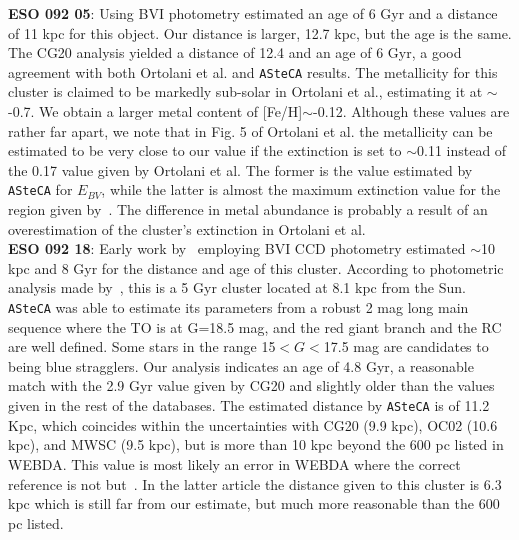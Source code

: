 \documentclass[draft]{aa}
\begin{document}
\begin{appendix}
  \noindent \textbf{ESO 092 05}: Using BVI photometry \cite{Ortolani_2008} estimated
  an age of 6 Gyr and a distance of 11 kpc for this object. Our distance is
  larger, 12.7 kpc, but the age is the same.
  The CG20 analysis yielded a distance of 12.4 and an age of 6 Gyr, a good
  agreement with both Ortolani et al. and \texttt{ASteCA} results.
  The metallicity for this cluster is claimed to be markedly sub-solar in
  Ortolani et al., estimating it at $\sim$-0.7. We obtain a
  larger metal content of [Fe/H]$\sim$-0.12. Although these values are rather far
  apart, we note that in Fig. 5 of Ortolani et al. the metallicity can be
  estimated to be very close to our value if the extinction is set to
  $\sim$0.11 instead of the 0.17 value given by Ortolani et al. The former is
  the value estimated by \texttt{ASteCA} for $E_{BV}$, while the latter
  is almost the maximum extinction value for the region given
  by~\cite{Schlafly_2011}. The difference in metal abundance is probably a
  result of an overestimation of the cluster's extinction in Ortolani et al.\\

  \noindent \textbf{ESO 092 18}: Early work by~\cite{Kubiak_1991} employing BVI CCD
  photometry estimated $\sim$10 kpc and 8 Gyr for the distance and age of this
  cluster.
  According to photometric analysis made by~\cite{Carraro1995}, this is a 5 Gyr
  cluster located at 8.1 kpc from the Sun.
  \texttt{ASteCA} was able to estimate its parameters from a robust 2 mag long
  main sequence where the TO is at G=18.5 mag, and the red giant branch and the
  RC are well defined. Some stars in the range 15$<G<$17.5 mag are candidates to
  being blue stragglers.
  Our analysis indicates an age of 4.8 Gyr, a reasonable match with the 2.9 Gyr
  value given by CG20 and slightly older than the values given in the rest of
  the databases. The estimated distance by \texttt{ASteCA} is of 11.2 Kpc, which
  coincides within the uncertainties with CG20 (9.9 kpc), OC02 (10.6 kpc), and
  MWSC (9.5 kpc), but is more than 10 kpc beyond the 600 pc listed in WEBDA.
  This value is most likely an error in WEBDA where the correct reference is
  not \cite{Phelps_1994_develop} but~\cite{Janes_1994}. In the latter article
  the distance given to this cluster is 6.3 kpc which is still far from our
  estimate, but much more reasonable than the 600 pc listed.\\


\end{appendix}
\end{document}
